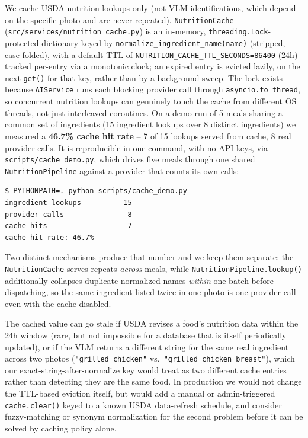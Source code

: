 \documentclass[11pt,a4paper]{article}
\begin{document}
\par\noindent
We cache USDA nutrition lookups only (not VLM identifications, which depend
on the specific photo and are never repeated). \texttt{NutritionCache}
(\texttt{src/services/nutrition\_cache.py}) is an in-memory,
\texttt{threading.Lock}-protected dictionary keyed by
\texttt{normalize\_ingredient\_name(name)} (stripped, case-folded), with a
default TTL of \texttt{NUTRITION\_CACHE\_TTL\_SECONDS=86400} (24h) tracked
per-entry via a monotonic clock; an expired entry is evicted lazily, on the
next \texttt{get()} for that key, rather than by a background sweep. The
lock exists because \texttt{AIService} runs each blocking provider call
through \texttt{asyncio.to\_thread}, so concurrent nutrition lookups can
genuinely touch the cache from different OS threads, not just interleaved
coroutines. On a demo run of 5 meals sharing a common set of ingredients (15 ingredient
lookups over 8 distinct ingredients) we measured a \textbf{46.7\% cache hit
rate} -- 7 of 15 lookups served from cache, 8 real provider calls. It is
reproducible in one command, with no API keys, via
\texttt{scripts/cache\_demo.py}, which drives five meals through one shared
\texttt{NutritionPipeline} against a provider that counts its own calls:
\begin{lstlisting}[language=bash,numbers=none,basicstyle=\ttfamily\small]
$ PYTHONPATH=. python scripts/cache_demo.py
ingredient lookups          15
provider calls               8
cache hits                   7
cache hit rate: 46.7%
\end{lstlisting}
Two distinct mechanisms produce that number and we keep them separate: the
\texttt{NutritionCache} serves repeats \emph{across} meals, while
\texttt{NutritionPipeline.lookup()} additionally collapses duplicate
normalized names \emph{within} one batch before dispatching, so the same
ingredient listed twice in one photo is one provider call even with the
cache disabled.

\par\noindent
The cached value can go stale if USDA revises a food's nutrition data
within the 24h window (rare, but not impossible for a database that is
itself periodically updated), or if the VLM returns a different string for
the same real ingredient across two photos (\texttt{"grilled chicken"} vs.\
\texttt{"grilled chicken breast"}), which our exact-string-after-normalize
key would treat as two different cache entries rather than detecting they
are the same food. In production we would not change the TTL-based
eviction itself, but would add a manual or admin-triggered
\texttt{cache.clear()} keyed to a known USDA data-refresh schedule, and
consider fuzzy-matching or synonym normalization for the second problem
before it can be solved by caching policy alone.
\end{document}
